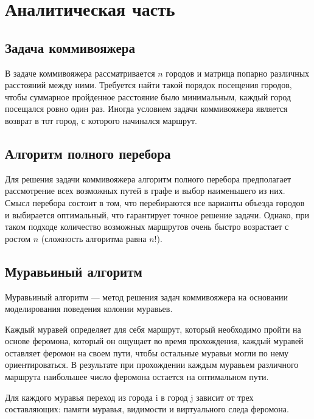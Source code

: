 \chapter{Аналитическая часть}
\section{Задача коммивояжера}

В задаче коммивояжера рассматривается $n$ городов и матрица попарно различных расстояний между ними.
Требуется найти такой порядок посещения городов, чтобы суммарное пройденное расстояние было минимальным, каждый город посещался ровно один раз.
Иногда условием задачи коммивояжера является возврат в тот город, с которого начинался маршрут.

\section{Алгоритм полного перебора}

Для решения задачи коммивояжера алгоритм полного перебора предполагает рассмотрение всех возможных путей в графе и выбор наименьшего из них. 
Смысл перебора состоит в том, что перебираются все варианты объезда городов и выбирается оптимальный, что гарантирует точное решение задачи.
Однако, при таком подходе количество возможных маршрутов очень быстро возрастает с ростом $n$ (сложность алгоритма равна $n!$).

\section{Муравьиный алгоритм}

Муравьиный алгоритм --- метод решения задач коммивояжера на основании моделирования поведения колонии муравьев.

Каждый муравей определяет для себя маршрут, который необходимо пройти на основе феромона, который он ощущает во время прохождения, каждый муравей оставляет феромон на своем пути, чтобы остальные муравьи могли по нему ориентироваться. В результате при прохождении каждым муравьем различного маршрута наибольшее число феромона остается на оптимальном пути.


Для каждого муравья переход из города i в город j зависит от трех составляющих: памяти муравья, видимости и виртуального следа феромона.

